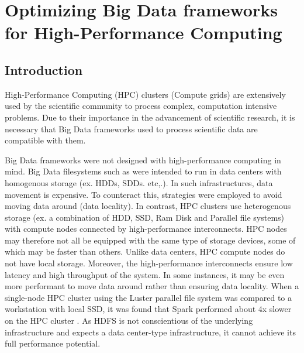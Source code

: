 \documentclass{report}
\begin{document}
\chapter{Optimizing Big Data frameworks for High-Performance Computing}
	\section{Introduction}
	High-Performance Computing (HPC) clusters (Compute grids) are extensively used by the scientific community to process complex, computation intensive problems. Due to their importance in the advancement of scientific research, it is necessary that Big Data frameworks used to process scientific data are compatible with them. 
	
	Big Data frameworks were not designed with high-performance computing in mind. Big Data filesystems such as were intended to run in data centers with homogenous storage (ex. HDDs, SDDs. etc,.). In such infrastructures, data movement is expensive. To counteract this, strategies were employed to avoid moving data around (data locality). In contrast, HPC clusters use heterogenous storage (ex. a combination of HDD, SSD, Ram Disk and Parallel file systems) with compute nodes connected by high-performance interconnects. HPC nodes may therefore not all be equipped with the same type of storage devices, some of which may be faster than others. Unlike data centers, HPC compute nodes do not have local storage. Moreover, the high-performance interconnects ensure low latency and high throughput of the system. In some instances, it may be even more performant to move data around rather than ensuring data locality. When a single-node HPC cluster using the Luster parallel file system was compared to a workstation with local SSD, it was found that Spark performed about 4x slower on the HPC cluster \cite{Chaimov:2016}.  As HDFS is not conscientious of the underlying infrastructure and expects a data center-type infrastructure, it cannot achieve its full performance potential. 
	
\end{document}
